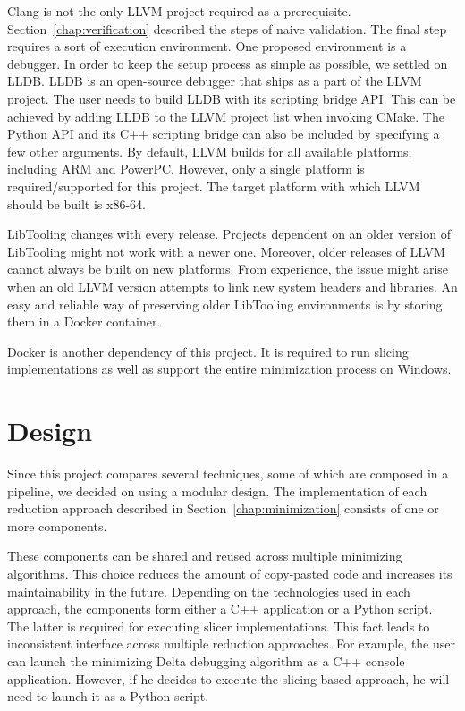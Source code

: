 Clang is not the only LLVM project required as a prerequisite.
Section~\ref{chap:verification} described the steps of naive validation. 
The final step requires a sort of execution environment. 
One proposed environment is a debugger. 
In order to keep the setup process as simple as possible, we settled on LLDB. 
LLDB is an open-source debugger that ships as a part of the LLVM project.
The user needs to build LLDB with its scripting bridge API.
This can be achieved by adding LLDB to the LLVM project list when invoking 
CMake.
The Python API and its C++ scripting bridge can also be included by 
specifying a few other arguments.
By default, LLVM builds for all available platforms, including ARM and 
PowerPC.
However, only a single platform is required/supported for this project.
The target platform with which LLVM should be built is x86-64.

LibTooling changes with every release.
Projects dependent on an older version of LibTooling might not work with 
a newer one.
Moreover, older releases of LLVM cannot always be built on new platforms.
From experience, the issue might arise when an old LLVM version attempts 
to link new system headers and libraries.
An easy and reliable way of preserving older LibTooling environments is by 
storing them in a Docker container.

Docker is another dependency of this project.
It is required to run slicing implementations as well as support the entire 
minimization process on Windows.

\section{Design}

Since this project compares several techniques, some of which are composed in 
a pipeline, we decided on using a modular design. 
The implementation of each reduction approach described in 
Section~\ref{chap:minimization} consists of one or more components. 

These components can be shared and reused across multiple minimizing 
algorithms. 
This choice reduces the amount of copy-pasted code and increases its 
maintainability in the future. 
Depending on the technologies used in each app\-roach, the components form 
either a C++ application or a Python script. 
The latter is required for executing slicer implementations. 
This fact leads to inconsistent interface across multiple reduction 
approaches. 
For example, the user can launch the minimizing Delta debugging algorithm as 
a C++ console application. 
However, if he decides to execute the slicing-based approach, he will need 
to launch it as a Python script.

